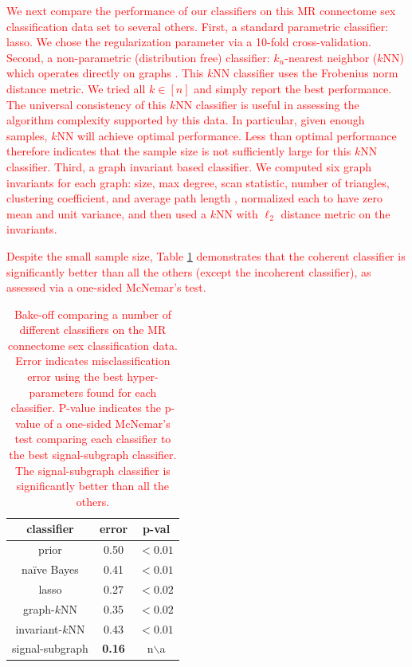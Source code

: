 \documentclass[10pt,journal,cspaper,compsoc]{IEEEtran}
\providecommand{\tr}[1]{\textcolor{red}{#1}}
\begin{document}
\tr{We next compare the performance of our classifiers on this MR connectome sex classification data set to several others. First, a standard parametric classifier: lasso.  We chose the regularization parameter via a 10-fold cross-validation.  Second, a non-parametric (distribution free) classifier: $k_n$-nearest neighbor ($k$NN) which operates directly on graphs \cite{VP11_super}.  This $k$NN classifier uses the Frobenius norm distance metric.  We tried all $k \in [n]$ and simply report the best performance. The universal consistency of this $k$NN classifier is useful in assessing the algorithm complexity supported by this data.  In particular, given enough samples, $k$NN will achieve optimal performance.  Less than optimal performance therefore indicates that the sample size is not sufficiently large for this $k$NN classifier.  Third, a graph invariant based classifier.  We computed six graph invariants for each graph: size, max degree, scan statistic, number of triangles, clustering coefficient, and average path length \cite{PCR10}, normalized each to have zero mean and unit variance, and then used a $k$NN with $\ell_2$ distance metric on the invariants.} 

\tr{Despite the small sample size, Table \ref{tab:bakeoff} demonstrates that the coherent classifier is significantly better than all the others (except the incoherent classifier), as assessed via a one-sided McNemar's test.}  %

\begin{table}
	\caption{\tr{Bake-off comparing a number of different classifiers on the MR connectome sex classification data.  Error indicates misclassification error using the best hyper-parameters found for each classifier. P-value indicates the p-value of a one-sided McNemar's test comparing each classifier to the best signal-subgraph classifier.  The signal-subgraph classifier is significantly better than all the others.}  }
	\begin{center}
\begin{tabular}{|c|c|c|}
	\hline
classifier & error & p-val \\
\hline \hline
prior 			& 0.50 & $<0.01$ \\ \hline
na\"ive Bayes 	& 0.41 & $<0.01$ 		\\ \hline
lasso 			& 0.27 & $<0.02$ 				  	\\ \hline
graph-$k$NN 	& 0.35 & $<0.02$ 	\\ \hline
invariant-$k$NN & 0.43 & $<0.01$		\\ \hline
signal-subgraph 		& \textbf{0.16} & n$\backslash$a \\ \hline
\end{tabular}
\end{center}
\label{tab:bakeoff}
\end{table}
\end{document}
